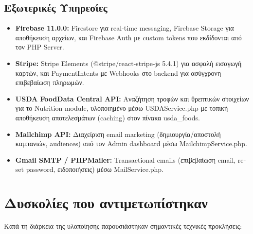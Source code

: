 \documentclass[12pt,a4paper]{report}
\begin{document}
\subsection{Εξωτερικές Υπηρεσίες}
\begin{itemize}[label=•]
    \item \textbf{Firebase 11.0.0:} \textenglish{Firestore} για \textenglish{real-time messaging}, \textenglish{Firebase Storage} για αποθήκευση αρχείων, και \textenglish{Firebase Auth} με \textenglish{custom tokens} που εκδίδονται από τον \textenglish{PHP Server}.
    \item \textbf{Stripe:} \textenglish{Stripe Elements} (\textenglish{@stripe/react-stripe-js 5.4.1}) για ασφαλή εισαγωγή καρτών, και \textenglish{PaymentIntents} με \textenglish{Webhooks} στο \textenglish{backend} για ασύγχρονη επιβεβαίωση πληρωμών.
    \item \textbf{USDA FoodData Central API:} Αναζήτηση τροφών και θρεπτικών στοιχείων για το \textenglish{Nutrition module}, υλοποιημένο μέσω \textenglish{USDAService.php} με τοπική αποθήκευση αποτελεσμάτων (\textenglish{caching}) στον πίνακα \textenglish{usda\_foods}.
    \item \textbf{Mailchimp API:} Διαχείριση \textenglish{email marketing} (δημιουργία/αποστολή καμπανιών, \textenglish{audiences}) από τον \textenglish{Admin dashboard} μέσω \textenglish{MailchimpService.php}.
    \item \textbf{Gmail SMTP / PHPMailer:} \textenglish{Transactional emails} (επιβεβαίωση \textenglish{email}, \textenglish{reset password}, ειδοποιήσεις) μέσω \textenglish{MailService.php}.
\end{itemize}

\newpage

\section{Δυσκολίες που αντιμετωπίστηκαν}
Κατά τη διάρκεια της υλοποίησης παρουσιάστηκαν σημαντικές τεχνικές προκλήσεις:
\end{document}
